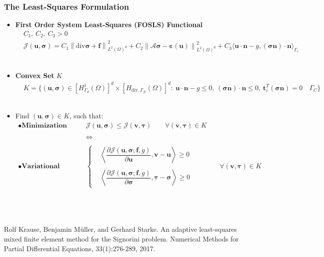 \documentclass[8pt, oneside]{beamer}   	%
\newcommand{\bff}{\textbf{f}}
\newcommand{\bn}{\textbf{n}}
\newcommand{\btau}{\boldsymbol{\tau}}
\newcommand{\bt}{\textbf{t}}
\newcommand{\bv}{\textbf{v}}
\newcommand{\bu}{\textbf{u}}
\newcommand{\bsigma}{\boldsymbol{\sigma}}
\newcommand\norm[1]{\left\lVert#1\right\rVert}
\newcommand{\titlecolor}[1]{\frametitle{\textcolor{dkgrey}{ \textbf{#1}}}}
\begin{document}
\begin{frame}
\titlecolor{The Least-Squares Formulation}
\begin{itemize}
\item \textbf{First Order System Least-Squares (FOSLS) Functional}
\small
\begin{align*}
& C_1, \:C_2, \: C_3>0 \\
&\mathcal{J}(\bu,\bsigma)=C_{1} \norm{\text{div} \bsigma+\bff}_{L^2(\Omega)^d}^2+C_{2} \norm{\mathcal{A}\bsigma -\boldsymbol{\varepsilon}(\bu)}_{L^2(\Omega)^d}^2   +C_{3} \langle \bu \cdot \bn -g, (\bsigma \bn) \cdot \bn \rangle_{\Gamma_c}
\end{align*} 
${}$\\
\item  
\normalsize
\textbf{Convex Set} $K$
\small
\begin{align*}
& K=\{  \left(\bu,  \bsigma \right)  \in  \left[H_{\Gamma_{d}}^1(\Omega) \right]^d \times \left[ H_{\text{div},\Gamma_N}(\Omega) \right]^d    : \: 
 \bu \cdot \bn - g  \leq 0, \:  (\bsigma \bn) \cdot \bn \leq 0,  \: \bt_i^T(\bsigma \bn) =0 \quad  \Gamma_C
 \}
\end{align*}
${}$\\
\item \normalsize 
Find $(\bu,\bsigma) \in K$, such that:
\small
\begin{align*}
\bullet \textbf{Minimization problem:} \qquad  &{ \mathcal{J}(\bu,\bsigma) \leq \mathcal{J}(\bv,\btau ) \qquad \forall (\bv,\btau) \in K}\\\\
&\iff\\\\
\bullet \textbf{Variational Inequality:}\qquad &{
\begin{cases}
&
\left\langle \dfrac{\partial \mathcal{J}(\bu,\bsigma;\bff,g)}{\partial \bu }, \bv-\bu \right\rangle 
\geq 0 \\\\
&
\left\langle \dfrac{\partial \mathcal{J}(\bu,\bsigma;\bff,g)}{\partial \bsigma }, \btau-\bsigma \right\rangle 
\geq 0 
\end{cases}
\qquad \qquad
\forall (\bv, \btau) \in K}
\end{align*}
\end{itemize}
\normalsize
${}$\\
${}$\\${}$\\
\tiny{Rolf Krause, Benjamin M\"{u}ller, and Gerhard Starke. An adaptive least-squares mixed finite element method for the Signorini problem. Numerical Methods for Partial Differential Equations, 33(1):276-289, 2017.}
\end{frame}
\end{document}
